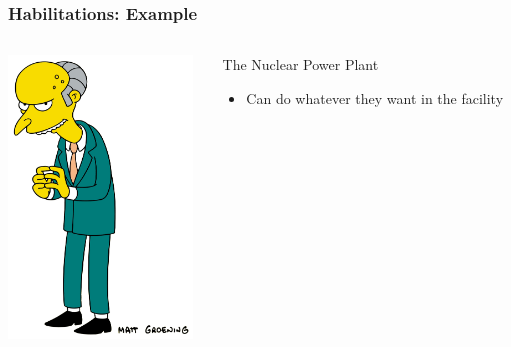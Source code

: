 \documentclass{beamer}
\begin{document}
\begin{frame}
\frametitle{Habilitations: Example}
\begin{columns}
 \begin{column}{0.45\textwidth}
         \includegraphics[height=7.5cm]{./pics/simpsons/Montgomery_Burns.png}
 \end{column}
 \begin{column}{0.45\textwidth}
    \begin{block}{The Nuclear Power Plant}
        \begin{itemize}
            \item Can do whatever they want in the facility
        \end{itemize}
    \end{block}
 \end{column}
\end{columns}
\end{frame}
\end{document}

